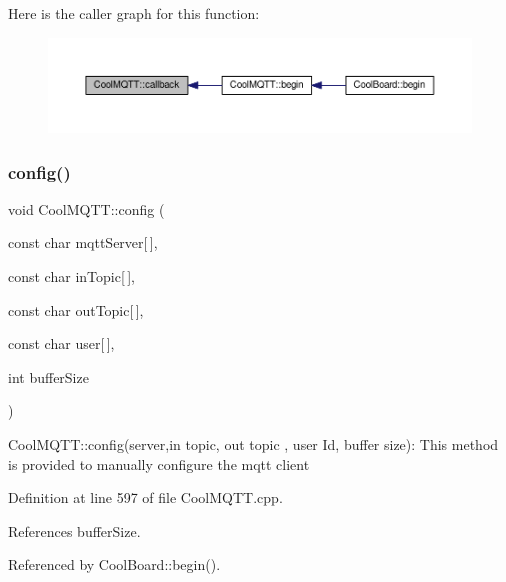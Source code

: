 Here is the caller graph for this function\+:\nopagebreak
\begin{figure}[H]
\begin{center}
\leavevmode
\includegraphics[width=350pt]{classCoolMQTT_a30d82ad665bfb603f46ecdbc290775df_icgraph}
\end{center}
\end{figure}
\mbox{\label{classCoolMQTT_a9b703de4f1358f0ee7a5e8c44979c648}} 
\subsubsection{\texorpdfstring{config()}{config()}\hspace{0.1cm}{\footnotesize\ttfamily [1/2]}}
{\footnotesize\ttfamily void Cool\+M\+Q\+T\+T\+::config (\begin{DoxyParamCaption}\item[{const char}]{mqtt\+Server\mbox{[}$\,$\mbox{]},  }\item[{const char}]{in\+Topic\mbox{[}$\,$\mbox{]},  }\item[{const char}]{out\+Topic\mbox{[}$\,$\mbox{]},  }\item[{const char}]{user\mbox{[}$\,$\mbox{]},  }\item[{int}]{buffer\+Size }\end{DoxyParamCaption})}

Cool\+M\+Q\+T\+T\+::config(server,in topic, out topic , user Id, buffer size)\+: This method is provided to manually configure the mqtt client 

Definition at line 597 of file Cool\+M\+Q\+T\+T.\+cpp.



References buffer\+Size.



Referenced by Cool\+Board\+::begin().


